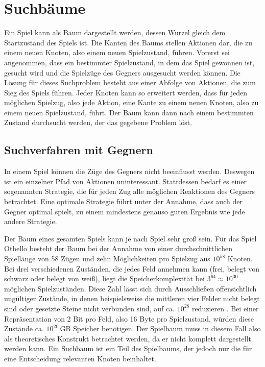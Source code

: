 \section{Suchbäume}
\label{sec:gametree}

Ein Spiel kann als Baum dargestellt werden, dessen Wurzel gleich dem Startzustand des Spiels ist. Die Kanten des Baums
stellen Aktionen dar, die zu einem neuen Knoten, also einem neuen Spielzustand, führen. Vorerst sei angenommen, dass ein
bestimmter Spielzustand, in dem das Spiel gewonnen ist, gesucht wird und die Spielzüge des Gegners ausgesucht werden
können. Die Lösung für dieses Suchproblem besteht aus einer Abfolge von Aktionen, die zum Sieg des Spiels führen. Jeder
Knoten kann so erweitert werden, dass für jeden möglichen Spielzug, also jede Aktion, eine Kante zu einem neuen Knoten,
also zu einem neuen Spielzustand, führt. Der Baum kann dann nach einem bestimmten Zustand durchsucht werden, der das
gegebene Problem löst.
\cite[S.~75]{ai2010russel}

\subsection{Suchverfahren mit Gegnern}
In einem Spiel können die Züge des Gegners nicht beeinflusst werden. Deswegen ist ein einzelner Pfad von Aktionen
uninteressant. Stattdessen bedarf es einer sogenannten Strategie, die für jeden Zug alle möglichen Reaktionen des
Gegners betrachtet. Eine optimale Strategie führt unter der Annahme, dass auch der Gegner optimal spielt, zu einem
mindestens genauso guten Ergebnis wie jede andere Strategie.
\cite[S.~163f.]{ai2010russel}

Der Baum eines gesamten Spiels kann je nach Spiel sehr groß sein. Für das Spiel Othello besteht der Baum bei der Annahme
von einer durchschnittlichen Spiellänge von 58 Zügen und zehn Möglichkeiten pro Spielzug aus $10^{58}$ Knoten. Bei drei
verschiedenen Zuständen, die jedes Feld annehmen kann (frei, belegt von schwarz oder belegt von weiß), liegt die
Speicherkomplexität bei $3^{64}\approx10^{30}$ möglichen Spielzuständen. Diese Zahl lässt sich durch Ausschließen
offensichtlich ungültiger Zustände, in denen beispielsweise die mittleren vier Felder nicht belegt sind oder gesetzte
Steine nicht verbunden sind, auf ca. $10^{28}$ reduzieren \cite[S.~167]{searchingforsolutions}.
Bei einer Repräsentation von 2 Bit pro Feld, also 16 Byte pro Spielzustand, würden diese Zustände ca. $10^{20}$\,GB
Speicher benötigen. Der Spielbaum muss in diesem Fall also als theoretisches Konstrukt betrachtet werden, da er nicht
komplett dargestellt werden kann. Ein Suchbaum ist ein Teil des Spielbaums, der jedoch nur die für eine Entscheidung
relevanten Knoten beinhaltet.
\cite[S.~162f.]{ai2010russel}

